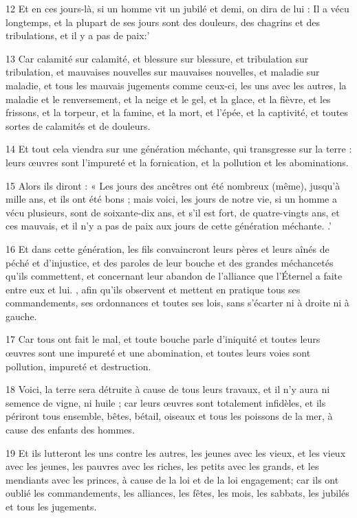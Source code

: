 \par 12 Et en ces jours-là, si un homme vit un jubilé et demi, on dira de lui : Il a vécu longtemps, et la plupart de ses jours sont des douleurs, des chagrins et des tribulations, et il y a pas de paix:'
\par 13 Car calamité sur calamité, et blessure sur blessure, et tribulation sur tribulation, et mauvaises nouvelles sur mauvaises nouvelles, et maladie sur maladie, et tous les mauvais jugements comme ceux-ci, les uns avec les autres, la maladie et le renversement, et la neige et le gel, et la glace, et la fièvre, et les frissons, et la torpeur, et la famine, et la mort, et l'épée, et la captivité, et toutes sortes de calamités et de douleurs.
\par 14 Et tout cela viendra sur une génération méchante, qui transgresse sur la terre : leurs œuvres sont l'impureté et la fornication, et la pollution et les abominations.
\par 15 Alors ils diront : « Les jours des ancêtres ont été nombreux (même), jusqu'à mille ans, et ils ont été bons ; mais voici, les jours de notre vie, si un homme a vécu plusieurs, sont de soixante-dix ans, et s'il est fort, de quatre-vingts ans, et ces mauvais, et il n'y a pas de paix aux jours de cette génération méchante. .'
\par 16 Et dans cette génération, les fils convaincront leurs pères et leurs aînés de péché et d'injustice, et des paroles de leur bouche et des grandes méchancetés qu'ils commettent, et concernant leur abandon de l'alliance que l'Éternel a faite entre eux et lui. , afin qu'ils observent et mettent en pratique tous ses commandements, ses ordonnances et toutes ses lois, sans s'écarter ni à droite ni à gauche.
\par 17 Car tous ont fait le mal, et toute bouche parle d'iniquité et toutes leurs œuvres sont une impureté et une abomination, et toutes leurs voies sont pollution, impureté et destruction.
\par 18 Voici, la terre sera détruite à cause de tous leurs travaux, et il n'y aura ni semence de vigne, ni huile ; car leurs œuvres sont totalement infidèles, et ils périront tous ensemble, bêtes, bétail, oiseaux et tous les poissons de la mer, à cause des enfants des hommes.
\par 19 Et ils lutteront les uns contre les autres, les jeunes avec les vieux, et les vieux avec les jeunes, les pauvres avec les riches, les petits avec les grands, et les mendiants avec les princes, à cause de la loi et de la loi engagement; car ils ont oublié les commandements, les alliances, les fêtes, les mois, les sabbats, les jubilés et tous les jugements.
